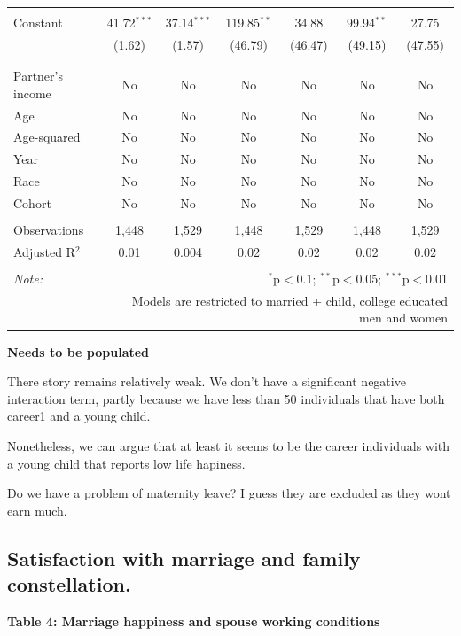 \documentclass[]{article}
\begin{document}
\begin{table}[!htbp]
\begin{tabular}{@{\extracolsep{5pt}}lcccccc}
  & & & & & & \\ 
 Constant & 41.72$^{***}$ & 37.14$^{***}$ & 119.85$^{**}$ & 34.88 & 99.94$^{**}$ & 27.75 \\ 
  & (1.62) & (1.57) & (46.79) & (46.47) & (49.15) & (47.55) \\ 
  & & & & & & \\ 
\hline \\[-1.8ex] 
Partner's income & No & No & No & No & No & No \\ 
Age & No & No & No & No & No & No \\ 
Age-squared & No & No & No & No & No & No \\ 
Year & No & No & No & No & No & No \\ 
Race & No & No & No & No & No & No \\ 
Cohort & No & No & No & No & No & No \\ 
\hline \\[-1.8ex] 
Observations & 1,448 & 1,529 & 1,448 & 1,529 & 1,448 & 1,529 \\ 
Adjusted R$^{2}$ & 0.01 & 0.004 & 0.02 & 0.02 & 0.02 & 0.02 \\ 
\hline 
\hline \\[-1.8ex] 
\textit{Note:}  & \multicolumn{6}{r}{$^{*}$p$<$0.1; $^{**}$p$<$0.05; $^{***}$p$<$0.01} \\ 
 & \multicolumn{6}{r}{Models are restricted to married + child, college educated men and women} \\ 
\end{tabular} 
\end{table}

\textbf{Needs to be populated}

There story remains relatively weak. We don't have a significant
negative interaction term, partly because we have less than 50
individuals that have both career1 and a young child.

Nonetheless, we can argue that at least it seems to be the career
individuals with a young child that reports low life hapiness.

Do we have a problem of maternity leave? I guess they are excluded as
they wont earn much.

\subsection{Satisfaction with marriage and family
constellation.}\label{satisfaction-with-marriage-and-family-constellation.}

\textbf{Table 4: Marriage happiness and spouse working conditions}
\end{document}
